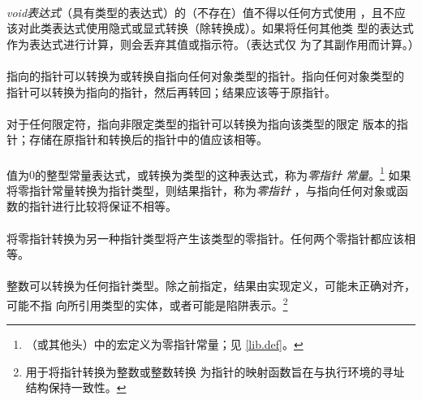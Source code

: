 {

\paragraph{}
\textit{void表达式}（具有类型的表达式）的（不存在）值不得以任何方式使用
，且不应该对此类表达式使用隐式或显式转换（除转换成）。如果将任何其他类
型的表达式作为表达式进行计算，则会丢弃其值或指示符。（表达式仅
为了其副作用而计算。）

\paragraph{}
指向的指针可以转换为或转换自指向任何对象类型的指针。指向任何对象类型的
指针可以转换为指向的指针，然后再转回；结果应该等于原指针。

\paragraph{}
对于任何限定符，指向非限定类型的指针可以转换为指向该类型的限定
版本的指针；存储在原指针和转换后的指针中的值应该相等。

\paragraph{}
值为$0$的整型常量表达式，或转换为类型的这种表达式，称为\textit{零指针
常量}。\footnote{（或其他头）中的宏定义为零指针常量；见
\ref{lib.def}。} 如果将零指针常量转换为指针类型，则结果指针，称为\textit{零指针}
，与指向任何对象或函数的指针进行比较将保证不相等。

\paragraph{}
将零指针转换为另一种指针类型将产生该类型的零指针。任何两个零指针都应该相等。

\paragraph{}
整数可以转换为任何指针类型。除之前指定，结果由实现定义，可能未正确对齐，可能不指
向所引用类型的实体，或者可能是陷阱表示。\footnote{用于将指针转换为整数或整数转换
为指针的映射函数旨在与执行环境的寻址结构保持一致性。}

}
